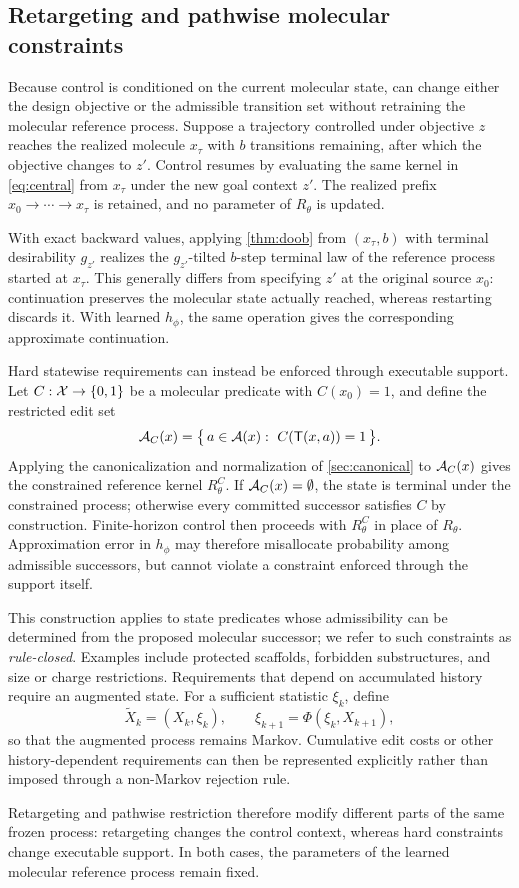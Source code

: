 \subsection{Retargeting and pathwise molecular constraints}
\label{sec:retarget}
\label{sec:pathwise}

Because control is conditioned on the current molecular state, \method{} can change either the design objective or the admissible transition set without retraining the molecular reference process. Suppose a trajectory controlled under objective $z$ reaches the realized molecule $x_\tau$ with $b$ transitions remaining, after which the objective changes to $z'$. Control resumes by evaluating the same kernel in \cref{eq:central} from $x_\tau$ under the new goal context $z'$. The realized prefix $x_0\rightarrow\cdots\rightarrow x_\tau$ is retained, and no parameter of $R_\theta$ is updated.

\begin{corollary}
\label{cor:retarget}
With exact backward values, applying \cref{thm:doob} from $(x_\tau,b)$ with terminal desirability $g_{z'}$ realizes the $g_{z'}$-tilted $b$-step terminal law of the reference process started at $x_\tau$. This generally differs from specifying $z'$ at the original source $x_0$: continuation preserves the molecular state actually reached, whereas restarting discards it. With learned $h_\phi$, the same operation gives the corresponding approximate continuation.
\end{corollary}

Hard statewise requirements can instead be enforced through executable support. Let $C:\mathcal{X}\to\{0,1\}$ be a molecular predicate with $C(x_0)=1$, and define the restricted edit set
\begin{equation}
\A_C(x)=\bigl\{\,a\in\A(x):\ C(\T(x,a))=1\,\bigr\}.
\label{eq:constrained}
\end{equation}
Applying the canonicalization and normalization of \cref{sec:canonical} to $\mathcal{A}_C(x)$ gives the constrained reference kernel $R^{C}_\theta$. If $\mathcal{A}_C(x)=\emptyset$, the state is terminal under the constrained process; otherwise every committed successor satisfies $C$ by construction. Finite-horizon control then proceeds with $R^{C}_\theta$ in place of $R_\theta$. Approximation error in $h_\phi$ may therefore misallocate probability among admissible successors, but cannot violate a constraint enforced through the support itself.

This construction applies to state predicates whose admissibility can be determined from the proposed molecular successor; we refer to such constraints as \emph{rule-closed}. Examples include protected scaffolds, forbidden substructures, and size or charge restrictions. Requirements that depend on accumulated history require an augmented state. For a sufficient statistic $\xi_k$, define
\[
\widetilde X_k=(X_k,\xi_k),\qquad \xi_{k+1}=\Phi(\xi_k,X_{k+1}),
\]
so that the augmented process remains Markov. Cumulative edit costs or other history-dependent requirements can then be represented explicitly rather than imposed through a non-Markov rejection rule.

Retargeting and pathwise restriction therefore modify different parts of the same frozen process: retargeting changes the control context, whereas hard constraints change executable support. In both cases, the parameters of the learned molecular reference process remain fixed.
